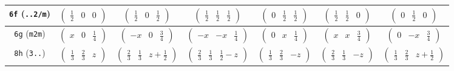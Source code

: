 \documentclass[fleqn,9pt,landscape]{jsarticle}
\begin{document}
\begin{center}
\begin{longtable}{ccccccc}
{\tt 6f} ({\tt ..2/m}) & $ \begin{pmatrix} \frac{1}{2} & 0 & 0 \end{pmatrix} $ & $ \begin{pmatrix} \frac{1}{2} & 0 & \frac{1}{2} \end{pmatrix} $ & $ \begin{pmatrix} \frac{1}{2} & \frac{1}{2} & \frac{1}{2} \end{pmatrix} $ & $ \begin{pmatrix} 0 & \frac{1}{2} & \frac{1}{2} \end{pmatrix} $ & $ \begin{pmatrix} \frac{1}{2} & \frac{1}{2} & 0 \end{pmatrix} $ & $ \begin{pmatrix} 0 & \frac{1}{2} & 0 \end{pmatrix} $ \\ \hline
{\tt 6g} ({\tt m2m}) & $ \begin{pmatrix} x & 0 & \frac{1}{4} \end{pmatrix} $ & $ \begin{pmatrix} - x & 0 & \frac{3}{4} \end{pmatrix} $ & $ \begin{pmatrix} - x & - x & \frac{1}{4} \end{pmatrix} $ & $ \begin{pmatrix} 0 & x & \frac{1}{4} \end{pmatrix} $ & $ \begin{pmatrix} x & x & \frac{3}{4} \end{pmatrix} $ & $ \begin{pmatrix} 0 & - x & \frac{3}{4} \end{pmatrix} $ \\ \hline
{\tt 8h} ({\tt 3..}) & $ \begin{pmatrix} \frac{1}{3} & \frac{2}{3} & z \end{pmatrix} $ & $ \begin{pmatrix} \frac{2}{3} & \frac{1}{3} & z + \frac{1}{2} \end{pmatrix} $ & $ \begin{pmatrix} \frac{2}{3} & \frac{1}{3} & \frac{1}{2} - z \end{pmatrix} $ & $ \begin{pmatrix} \frac{1}{3} & \frac{2}{3} & - z \end{pmatrix} $ & $ \begin{pmatrix} \frac{2}{3} & \frac{1}{3} & - z \end{pmatrix} $ & $ \begin{pmatrix} \frac{1}{3} & \frac{2}{3} & z + \frac{1}{2} \end{pmatrix} $ \\

\end{longtable}
\end{center}
\end{document}
